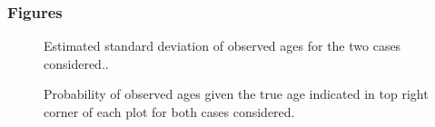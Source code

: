 \documentclass[11pt]{book}
\begin{document}
\hypertarget{figures}{%
\subsubsection{Figures}\label{figures}}
\begin{figure}[htb]

{\centering {} 

}

\caption{Estimated standard deviation of observed ages for the two cases considered..}\label{fig:unnamed-chunk-5}
\end{figure}
\newpage
\begin{figure}[htb]

{\centering {} 

}

\caption{Probability of observed ages given the true age indicated in top right corner of each plot for both cases considered.}\label{fig:unnamed-chunk-6}
\end{figure}
\end{document}
